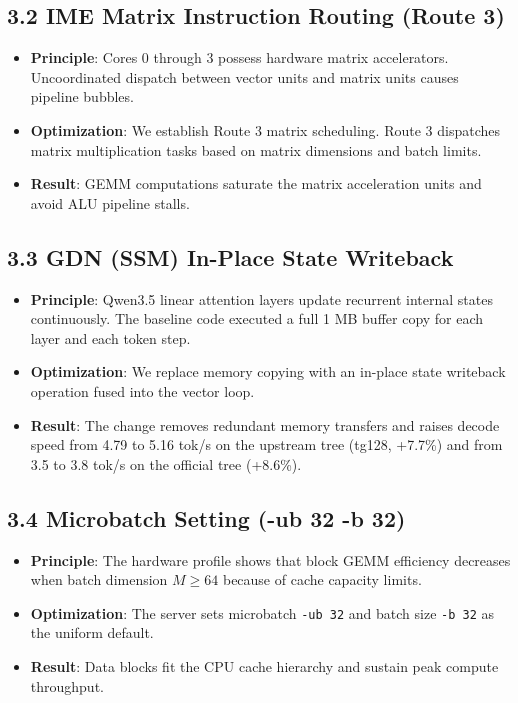 \documentclass[10pt,a4paper]{article}
\begin{document}
\subsection{3.2 IME Matrix Instruction Routing (Route 3)}
\begin{itemize}
  \item \textbf{Principle}: Cores 0 through 3 possess hardware matrix accelerators. Uncoordinated dispatch between vector units and matrix units causes pipeline bubbles.
  \item \textbf{Optimization}: We establish Route 3 matrix scheduling. Route 3 dispatches matrix multiplication tasks based on matrix dimensions and batch limits.
  \item \textbf{Result}: GEMM computations saturate the matrix acceleration units and avoid ALU pipeline stalls.
\end{itemize}

\subsection{3.3 GDN (SSM) In-Place State Writeback}
\begin{itemize}
  \item \textbf{Principle}: Qwen3.5 linear attention layers update recurrent internal states continuously. The baseline code executed a full 1 MB buffer copy for each layer and each token step.
  \item \textbf{Optimization}: We replace memory copying with an in-place state writeback operation fused into the vector loop.
  \item \textbf{Result}: The change removes redundant memory transfers and raises decode speed from 4.79 to 5.16 tok/s on the upstream tree (tg128, +7.7\%) and from 3.5 to 3.8 tok/s on the official tree (+8.6\%).
\end{itemize}

\subsection{3.4 Microbatch Setting (-ub 32 -b 32)}
\begin{itemize}
  \item \textbf{Principle}: The hardware profile shows that block GEMM efficiency decreases when batch dimension $M \ge 64$ because of cache capacity limits.
  \item \textbf{Optimization}: The server sets microbatch \texttt{-ub 32} and batch size \texttt{-b 32} as the uniform default.
  \item \textbf{Result}: Data blocks fit the CPU cache hierarchy and sustain peak compute throughput.
\end{itemize}
\end{document}

